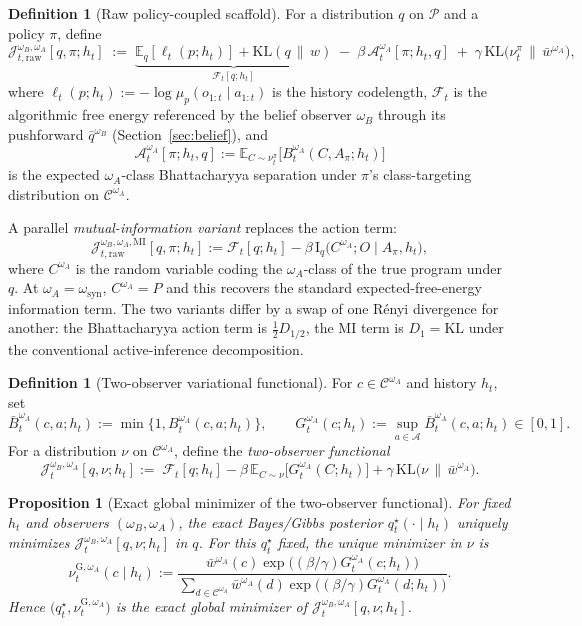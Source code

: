 \documentclass[11pt]{article}
\newtheorem{proposition}[theorem]{Proposition}
\theoremstyle{definition}
\newtheorem{definition}[theorem]{Definition}
\theoremstyle{remark}
\newcommand{\Acal}{\mathcal{A}}
\newcommand{\Ccal}{\mathcal{C}}
\newcommand{\Pcal}{\mathcal{P}}
\newcommand{\E}{\mathbb{E}}
\newcommand{\KL}{\mathrm{KL}}
\newcommand{\I}{\mathrm{I}}
\newcommand{\givena}{\,\|\,}
\newcommand{\ellp}{\ell}
\begin{document}
\begin{definition}[Raw policy-coupled scaffold]
\label{def:raw-two-observer-functional}
For a distribution $q$ on $\Pcal$ and a policy $\pi$, define
\[
\mathcal J_{t,\mathrm{raw}}^{\omega_B,\omega_A}[q,\pi;h_t]
\;:=\;
\underbrace{\E_q[\ellp_t(p;h_t)]+\KL(q\givena w)}_{\mathcal F_t[q;h_t]}
\;-\;\beta\,\mathcal A_t^{\omega_A}[\pi;h_t,q]
\;+\;\gamma\,\KL\!\bigl(\nu_t^\pi\,\|\,\bar w^{\omega_A}\bigr),
\]
where $\ellp_t(p;h_t):=-\log\mu_p(o_{1:t}\mid a_{1:t})$ is the history codelength, $\mathcal F_t$ is the algorithmic free energy referenced by the belief observer $\omega_B$ through its pushforward $\bar q^{\omega_B}$ (Section~\ref{sec:belief}), and
\[
\mathcal A_t^{\omega_A}[\pi;h_t,q]:=\E_{C\sim\nu_t^\pi}\bigl[B_t^{\omega_A}(C,A_\pi;h_t)\bigr]
\]
is the expected $\omega_A$-class Bhattacharyya separation under $\pi$'s class-targeting distribution on $\Ccal^{\omega_A}$.
\end{definition}

A parallel \emph{mutual-information variant} replaces the action term:
\[
\mathcal J_{t,\mathrm{raw}}^{\omega_B,\omega_A,\mathrm{MI}}[q,\pi;h_t]
:=\mathcal F_t[q;h_t]-\beta\,\I_q\!\bigl(C^{\omega_A};O\mid A_\pi,h_t\bigr),
\]
where $C^{\omega_A}$ is the random variable coding the $\omega_A$-class of the true program under $q$. At $\omega_A=\omega_{\mathrm{syn}}$, $C^{\omega_A}=P$ and this recovers the standard expected-free-energy information term. The two variants differ by a swap of one R\'enyi divergence for another: the Bhattacharyya action term is $\tfrac{1}{2}D_{1/2}$, the MI term is $D_1=\KL$ under the conventional active-inference decomposition.

\begin{definition}[Two-observer variational functional]
\label{def:two-observer-functional}
For $c\in\Ccal^{\omega_A}$ and history $h_t$, set
\[
\bar B_t^{\omega_A}(c,a;h_t):=\min\!\bigl\{1,B_t^{\omega_A}(c,a;h_t)\bigr\},
\qquad
G_t^{\omega_A}(c;h_t):=\sup_{a\in\Acal}\bar B_t^{\omega_A}(c,a;h_t)\in[0,1].
\]
For a distribution $\nu$ on $\Ccal^{\omega_A}$, define the \emph{two-observer functional}
\[
\boxed{\;
\mathcal J_t^{\omega_B,\omega_A}[q,\nu;h_t]
:=\;
\mathcal F_t[q;h_t]
-\beta\,\E_{C\sim\nu}\!\bigl[G_t^{\omega_A}(C;h_t)\bigr]
+\gamma\,\KL\!\bigl(\nu\,\|\,\bar w^{\omega_A}\bigr).
\;}
\]
\end{definition}

\begin{proposition}[Exact global minimizer of the two-observer functional]
\label{prop:two-observer-minimizer}
For fixed $h_t$ and observers $(\omega_B,\omega_A)$, the exact Bayes/Gibbs posterior $q_t^\star(\cdot\mid h_t)$ uniquely minimizes $\mathcal J_t^{\omega_B,\omega_A}[q,\nu;h_t]$ in $q$. For this $q_t^\star$ fixed, the unique minimizer in $\nu$ is
\[
\nu_t^{\mathrm G,\omega_A}(c\mid h_t)
:=
\frac{\bar w^{\omega_A}(c)\exp\!\bigl((\beta/\gamma)G_t^{\omega_A}(c;h_t)\bigr)}
{\sum_{d\in\Ccal^{\omega_A}}\bar w^{\omega_A}(d)\exp\!\bigl((\beta/\gamma)G_t^{\omega_A}(d;h_t)\bigr)}.
\]
Hence $\bigl(q_t^\star,\nu_t^{\mathrm G,\omega_A}\bigr)$ is the exact global minimizer of $\mathcal J_t^{\omega_B,\omega_A}[q,\nu;h_t]$.
\end{proposition}
\end{document}
